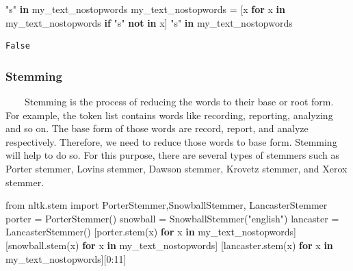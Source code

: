 \documentclass[
  letterpaper,
  DIV=11,
  numbers=noendperiod]{scrreprt}
\newenvironment{Shaded}{\begin{snugshade}}{\end{snugshade}}
\newcommand{\CommentTok}[1]{\textcolor[rgb]{0.37,0.37,0.37}{#1}}
\newcommand{\ControlFlowTok}[1]{\textcolor[rgb]{0.00,0.23,0.31}{\textbf{#1}}}
\newcommand{\DecValTok}[1]{\textcolor[rgb]{0.68,0.00,0.00}{#1}}
\newcommand{\ImportTok}[1]{\textcolor[rgb]{0.00,0.46,0.62}{#1}}
\newcommand{\KeywordTok}[1]{\textcolor[rgb]{0.00,0.23,0.31}{\textbf{#1}}}
\newcommand{\NormalTok}[1]{\textcolor[rgb]{0.00,0.23,0.31}{#1}}
\newcommand{\OperatorTok}[1]{\textcolor[rgb]{0.37,0.37,0.37}{#1}}
\newcommand{\StringTok}[1]{\textcolor[rgb]{0.13,0.47,0.30}{#1}}
\begin{document}
\begin{Shaded}
\begin{Highlighting}[]
\CommentTok{"\textquotesingle{}s"} \KeywordTok{in}\NormalTok{ my\_text\_nostopwords}
\NormalTok{my\_text\_nostopwords }\OperatorTok{=}\NormalTok{ [x }\ControlFlowTok{for}\NormalTok{ x }\KeywordTok{in}\NormalTok{ my\_text\_nostopwords }\ControlFlowTok{if} \StringTok{"\textquotesingle{}s"} \KeywordTok{not} \KeywordTok{in}\NormalTok{ x]}
\CommentTok{"\textquotesingle{}s"} \KeywordTok{in}\NormalTok{ my\_text\_nostopwords}
\end{Highlighting}
\end{Shaded}

\begin{verbatim}
False
\end{verbatim}

\subsubsection{Stemming}\label{stemming}

~~~~Stemming is the process of reducing the words to their base or root
form. For example, the token list contains words like recording,
reporting, analyzing and so on. The base form of those words are record,
report, and analyze respectively. Therefore, we need to reduce those
words to base form. Stemming will help to do so. For this purpose, there
are several types of stemmers such as Porter stemmer, Lovins stemmer,
Dawson stemmer, Krovetz stemmer, and Xerox stemmer.

\begin{Shaded}
\begin{Highlighting}[]
\ImportTok{from}\NormalTok{ nltk.stem }\ImportTok{import}\NormalTok{ PorterStemmer,SnowballStemmer, LancasterStemmer}
\NormalTok{porter }\OperatorTok{=}\NormalTok{ PorterStemmer()}
\NormalTok{snowball }\OperatorTok{=}\NormalTok{ SnowballStemmer(}\StringTok{"english"}\NormalTok{)}
\NormalTok{lancaster }\OperatorTok{=}\NormalTok{ LancasterStemmer()}
\NormalTok{[porter.stem(x) }\ControlFlowTok{for}\NormalTok{ x }\KeywordTok{in}\NormalTok{ my\_text\_nostopwords]}
\NormalTok{[snowball.stem(x) }\ControlFlowTok{for}\NormalTok{ x }\KeywordTok{in}\NormalTok{ my\_text\_nostopwords]}
\NormalTok{[lancaster.stem(x) }\ControlFlowTok{for}\NormalTok{ x }\KeywordTok{in}\NormalTok{ my\_text\_nostopwords][}\DecValTok{0}\NormalTok{:}\DecValTok{11}\NormalTok{]}
\end{Highlighting}
\end{Shaded}
\end{document}
